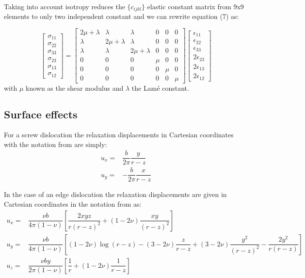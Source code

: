 Taking into account isotropy reduces the $\{c_{ijkl}\}$ elastic constant matrix from 9x9 elements to only two independent constant and we can rewrite equation (7) as:

\begin{equation}
\begin{bmatrix}
\sigma_{11}\\
\sigma_{22}\\
\sigma_{33}\\
\sigma_{23}\\
\sigma_{13}\\
\sigma_{12}
\end{bmatrix}
=
\begin{bmatrix}
2\mu+\lambda  &  \lambda       &  \lambda       &  0 & 0 & 0\\
\lambda       &  2\mu+\lambda  &  \lambda       &  0 & 0 & 0\\
\lambda       &       \lambda  &  2\mu+\lambda  &  0 & 0 & 0\\
 0            &       0        &  0             &\mu & 0 & 0\\
 0            &       0        &  0             &0   &\mu& 0\\
 0            &       0        &  0             &0   & 0 & \mu
\end{bmatrix}
%
\begin{bmatrix}
\epsilon_{11}\\
\epsilon_{22}\\
\epsilon_{33}\\
2\epsilon_{23}\\
2\epsilon_{13}\\
2\epsilon_{12}
\end{bmatrix}
\end{equation}
with $\mu$ known as the shear modulus and $\lambda$ the Lam\'{e} constant.

 
 \subsection{Surface effects}
 For a screw dislocation the relaxation displacements in Cartesian coordinates with the notation from \cite{Indenbom} are simply:
\begin{align}
u_x =& \dfrac{b}{2\pi}\dfrac{y}{r-z}\\
u_y =& -\dfrac{b}{2\pi}\dfrac{x}{r-z}
\end{align}

In the case of an edge dislocation the relaxation displacements are given in Cartesian coordinates in the notation from \cite{Indenbom} as:
\begin{align}
u_x =& \dfrac{\nu b}{4 \pi(1-\nu)} \left[\dfrac{2xyz}{r(r-z)^2}+(1-2\nu)\dfrac{xy}{(r-z)^2}\right] \\
u_y =& \dfrac{\nu b}{4 \pi(1-\nu)} \left[(1-2\nu)\log(r-z) - (3-2\nu)\dfrac{z}{r-z} + (3-2\nu)\dfrac{y^2}{(r-z)^2} - \dfrac{2y^2}{r(r-z)}\right] \\
u_z =& \dfrac{\nu b y}{2\pi(1-\nu)} \left[\dfrac{1}{r} + (1-2\nu)\dfrac{1}{r-z}\right]
\end{align}